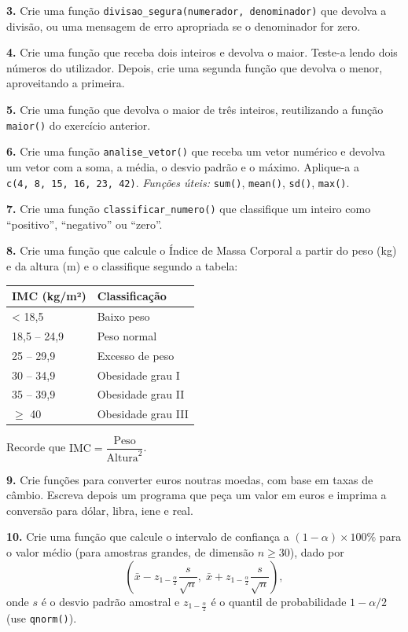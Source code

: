 \documentclass[
  portuguese,
  11pt,
  openany]{book}
\newcounter{none} %
\begin{document}
\textbf{3.} Crie uma função \texttt{divisao\_segura(numerador,\ denominador)} que devolva a
divisão, ou uma mensagem de erro apropriada se o denominador for zero.

\textbf{4.} Crie uma função que receba dois inteiros e devolva o maior. Teste-a lendo
dois números do utilizador. Depois, crie uma segunda função que devolva o menor,
aproveitando a primeira.

\textbf{5.} Crie uma função que devolva o maior de três inteiros, reutilizando a função
\texttt{maior()} do exercício anterior.

\textbf{6.} Crie uma função \texttt{analise\_vetor()} que receba um vetor numérico e devolva um
vetor com a soma, a média, o desvio padrão e o máximo. Aplique-a a
\texttt{c(4,\ 8,\ 15,\ 16,\ 23,\ 42)}. \emph{Funções úteis:} \texttt{sum()}, \texttt{mean()}, \texttt{sd()}, \texttt{max()}.

\textbf{7.} Crie uma função \texttt{classificar\_numero()} que classifique um inteiro como
``positivo'', ``negativo'' ou ``zero''.

\textbf{8.} Crie uma função que calcule o Índice de Massa Corporal a partir do peso
(kg) e da altura (m) e o classifique segundo a tabela:

{\def\LTcaptype{none} %
\begin{longtable}[]{@{}ll@{}}
\toprule\noalign{}
IMC (kg/m²) & Classificação \\
\midrule\noalign{}
\endhead
\bottomrule\noalign{}
\endlastfoot
\textless{} 18,5 & Baixo peso \\
18,5 -- 24,9 & Peso normal \\
25 -- 29,9 & Excesso de peso \\
30 -- 34,9 & Obesidade grau I \\
35 -- 39,9 & Obesidade grau II \\
\(\geq\) 40 & Obesidade grau III \\
\end{longtable}
}

Recorde que \(\text{IMC} = \dfrac{\text{Peso}}{\text{Altura}^2}\).

\textbf{9.} Crie funções para converter euros noutras moedas, com base em taxas de
câmbio. Escreva depois um programa que peça um valor em euros e imprima a
conversão para dólar, libra, iene e real.

\textbf{10.} Crie uma função que calcule o intervalo de confiança a
\((1 - \alpha) \times 100\%\) para o valor médio (para amostras grandes, de dimensão
\(n \geq 30\)), dado por
\[\left(\bar{x} - z_{1-\frac{\alpha}{2}}\frac{s}{\sqrt{n}},\;
\bar{x} + z_{1-\frac{\alpha}{2}}\frac{s}{\sqrt{n}}\right),\]
onde \(s\) é o desvio padrão amostral e \(z_{1-\frac{\alpha}{2}}\) é o quantil de
probabilidade \(1 - \alpha/2\) (use \texttt{qnorm()}).
\end{document}

